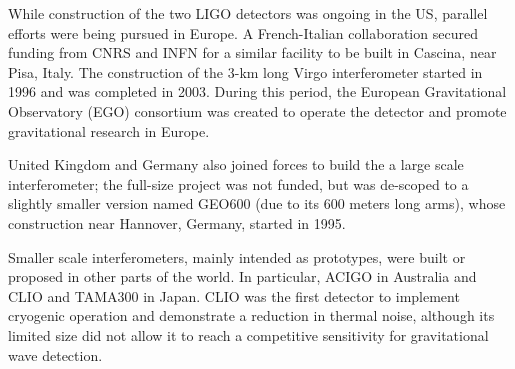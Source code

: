 While construction of the two LIGO detectors was ongoing in the US, parallel efforts 
were being pursued in Europe. A French-Italian collaboration secured funding from CNRS and INFN for a 
similar facility to be built in Cascina, near Pisa, Italy.
The construction of the 3-km long Virgo interferometer started in 1996 and was completed in 2003.
During this period, the European Gravitational Observatory (EGO) consortium was created to operate the detector 
and promote gravitational research in Europe.

United Kingdom and Germany also joined forces to build the a large scale interferometer; the full-size project was not funded, but was de-scoped to a slightly smaller version named GEO600 (due to its 600 meters long arms), 
whose construction near Hannover, Germany, started in 1995.

Smaller scale interferometers, mainly intended as prototypes, were built or 
proposed in other parts of the world. In particular, ACIGO in Australia and 
CLIO and TAMA300 in Japan. CLIO was the first detector to implement cryogenic operation and demonstrate a reduction in thermal noise, although its limited size did not allow it to reach a competitive sensitivity for gravitational wave detection.


